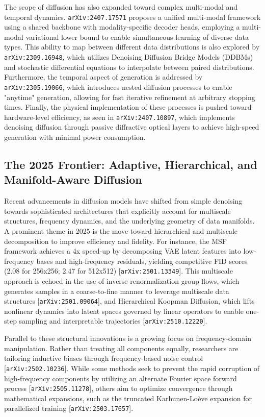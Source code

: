 \documentclass[11pt]{article}
\begin{document}
The scope of diffusion has also expanded toward complex multi-modal and temporal dynamics. \texttt{arXiv:2407.17571} proposes a unified multi-modal framework using a shared backbone with modality-specific decoder heads, employing a multi-modal variational lower bound to enable simultaneous learning of diverse data types. This ability to map between different data distributions is also explored by \texttt{arXiv:2309.16948}, which utilizes Denoising Diffusion Bridge Models (DDBMs) and stochastic differential equations to interpolate between paired distributions. Furthermore, the temporal aspect of generation is addressed by \texttt{arXiv:2305.19066}, which introduces nested diffusion processes to enable "anytime" generation, allowing for fast iterative refinement at arbitrary stopping times. Finally, the physical implementation of these processes is pushed toward hardware-level efficiency, as seen in \texttt{arXiv:2407.10897}, which implements denoising diffusion through passive diffractive optical layers to achieve high-speed generation with minimal power consumption.

\subsection{The 2025 Frontier: Adaptive, Hierarchical, and Manifold-Aware Diffusion}

Recent advancements in diffusion models have shifted from simple denoising towards sophisticated architectures that explicitly account for multiscale structures, frequency dynamics, and the underlying geometry of data manifolds. A prominent theme in 2025 is the move toward hierarchical and multiscale decomposition to improve efficiency and fidelity. For instance, the MSF framework achieves a 4x speed-up by decomposing VAE latent features into low-frequency bases and high-frequency residuals, yielding competitive FID scores (2.08 for 256x256; 2.47 for 512x512) [\texttt{arXiv:2501.13349}]. This multiscale approach is echoed in the use of inverse renormalization group flows, which generates samples in a coarse-to-fine manner to leverage multiscale data structures [\texttt{arXiv:2501.09064}], and Hierarchical Koopman Diffusion, which lifts nonlinear dynamics into latent spaces governed by linear operators to enable one-step sampling and interpretable trajectories [\texttt{arXiv:2510.12220}].

Parallel to these structural innovations is a growing focus on frequency-domain manipulation. Rather than treating all components equally, researchers are tailoring inductive biases through frequency-based noise control [\texttt{arXiv:2502.10236}]. While some methods seek to prevent the rapid corruption of high-frequency components by utilizing an alternate Fourier space forward process [\texttt{arXiv:2505.11278}], others aim to optimize convergence through mathematical expansions, such as the truncated Karhunen-Loève expansion for parallelized training [\texttt{arXiv:2503.17657}].
\end{document}
